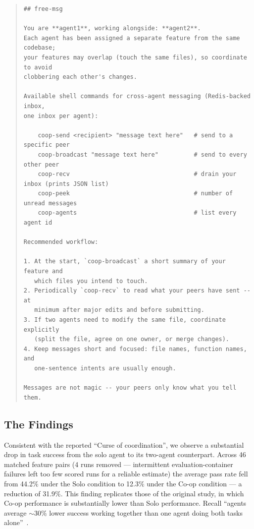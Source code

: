 \documentclass[11pt,a4paper]{article}
\begin{document}
\begin{quote}
\footnotesize
\begin{verbatim}
## free-msg

You are **agent1**, working alongside: **agent2**.
Each agent has been assigned a separate feature from the same codebase;
your features may overlap (touch the same files), so coordinate to avoid
clobbering each other's changes.

Available shell commands for cross-agent messaging (Redis-backed inbox,
one inbox per agent):

    coop-send <recipient> "message text here"   # send to a specific peer
    coop-broadcast "message text here"          # send to every other peer
    coop-recv                                   # drain your inbox (prints JSON list)
    coop-peek                                   # number of unread messages
    coop-agents                                 # list every agent id

Recommended workflow:

1. At the start, `coop-broadcast` a short summary of your feature and
   which files you intend to touch.
2. Periodically `coop-recv` to read what your peers have sent -- at
   minimum after major edits and before submitting.
3. If two agents need to modify the same file, coordinate explicitly
   (split the file, agree on one owner, or merge changes).
4. Keep messages short and focused: file names, function names, and
   one-sentence intents are usually enough.

Messages are not magic -- your peers only know what you tell them.
\end{verbatim}
\end{quote}

\subsection{The Findings}\label{sec:replfindings}

Consistent with the reported ``Curse of coordination'', we observe a substantial drop in task success from the solo agent to its two-agent counterpart. Across 46 matched feature pairs (4 runs removed --- intermittent evaluation-container failures left too few scored runs for a reliable estimate) the average pass rate fell from 44.2\% under the Solo condition to 12.3\% under the Co-op condition --- a reduction of 31.9\%. This finding replicates those of the original study, in which Co-op performance is substantially lower than Solo performance. Recall ``agents average ${\sim}30\%$ lower success working together than one agent doing both tasks alone''~\cite{khatua2026cooperbench}.
\end{document}
